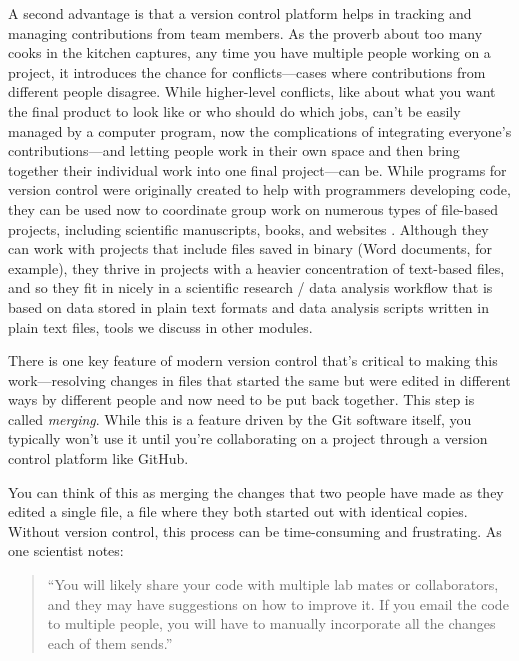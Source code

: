 \documentclass[]{tufte-book}
\begin{document}
A second advantage is that a version control platform helps in tracking and
managing contributions from team members. As the proverb about too many cooks in
the kitchen captures, any time you have multiple people working on a project, it
introduces the chance for conflicts---cases where contributions from different
people disagree. While higher-level conflicts, like about what you want the
final product to look like or who should do which jobs, can't be easily managed
by a computer program, now the complications of integrating everyone's
contributions---and letting people work in their own space and then bring
together their individual work into one final project---can be. While
programs for version control were originally created to help with programmers
developing code, they can be used now to coordinate group work on numerous types
of file-based projects, including scientific manuscripts, books, and websites
\citep{raymondunderstanding}. Although they can work with projects that include
files saved in binary (Word documents, for example), they thrive in projects
with a heavier concentration of text-based files, and so they fit in nicely in a
scientific research / data analysis workflow that is based on data stored in
plain text formats and data analysis scripts written in plain text files, tools
we discuss in other modules.

There is one key feature of modern version control that's critical to making
this work---resolving changes in files that started the same but were edited in
different ways by different people and now need to be put back together. This
step is called \emph{merging}. While this is a feature driven by the Git software
itself, you typically won't use it until you're collaborating on a project
through a version control platform like GitHub.

You can think of this as merging the changes that two people have made as
they edited a single file, a file where they both started out with identical
copies. Without version control, this process can be time-consuming and
frustrating. As one scientist notes:

\begin{quote}
``You will likely share your code with multiple lab mates or collaborators,
and they may have suggestions on how to improve it. If you email the code
to multiple people, you will have to manually incorporate all the changes
each of them sends.'' \citep{blischak2016quick}
\end{quote}
\end{document}
